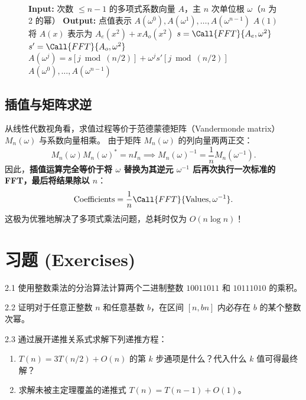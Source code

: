 \begin{figure}[htbp]
\centering
\begin{tcolorbox}[colback=white,colframe=gray!50!black,title={\textbf{图 2.7}\quad 快速傅里叶变换 (FFT 多项式表述)}]
\begin{algorithmic}[1]
    \State \textbf{Input:} 次数 $\le n-1$ 的多项式系数向量 $A$，主 $n$ 次单位根 $\omega$（$n$ 为 2 的幂）
    \State \textbf{Output:} 点值表示 $A(\omega^0), A(\omega^1), \dots, A(\omega^{n-1})$
     \Return $A(1)$ \EndIf
    \State 将 $A(x)$ 表示为 $A_e(x^2) + x A_o(x^2)$
    \State $s = \Call{FFT}{A_e, \omega^2}$
    \State $s' = \Call{FFT}{A_o, \omega^2}$
        \State $A(\omega^j) = s[j \bmod (n/2)] + \omega^j s'[j \bmod (n/2)]$
    \EndFor
    \State \Return $A(\omega^0), \dots, A(\omega^{n-1})$
\EndFunction
\end{algorithmic}
\end{tcolorbox}
\label{fig:fft_alg}
\end{figure}

\subsection*{插值与矩阵求逆}
从线性代数视角看，求值过程等价于范德蒙德矩阵（Vandermonde matrix）$M_n(\omega)$ 与系数向量相乘。
由于矩阵 $M_n(\omega)$ 的列向量两两正交：
\[
M_n(\omega) M_n(\omega)^* = n I_n \implies M_n(\omega)^{-1} = \frac{1}{n} M_n(\omega^{-1}).
\]
因此，\textbf{插值运算完全等价于将 $\omega$ 替换为其逆元 $\omega^{-1}$ 后再次执行一次标准的 FFT，最后将结果除以 $n$}：
\[
\text{Coefficients} = \frac{1}{n} \Call{FFT}{\text{Values}, \omega^{-1}}.
\]
这极为优雅地解决了多项式乘法问题，总耗时仅为 $O(n \log n)$！

\newpage
\section*{习题 (Exercises)}

\begin{exercise}{2.1}
使用整数乘法的分治算法计算两个二进制整数 $10011011$ 和 $10111010$ 的乘积。
\end{exercise}

\begin{exercise}{2.2}
证明对于任意正整数 $n$ 和任意基数 $b$，在区间 $[n, bn]$ 内必存在 $b$ 的某个整数次幂。
\end{exercise}

\begin{exercise}{2.3}
通过展开递推关系式求解下列递推方程：
\begin{enumerate}
    \item[(a)] $T(n) = 3T(n/2) + O(n)$ 的第 $k$ 步通项是什么？代入什么 $k$ 值可得最终解？
    \item[(b)] 求解未被主定理覆盖的递推式 $T(n) = T(n - 1) + O(1)$。
\end{enumerate}
\end{exercise}

